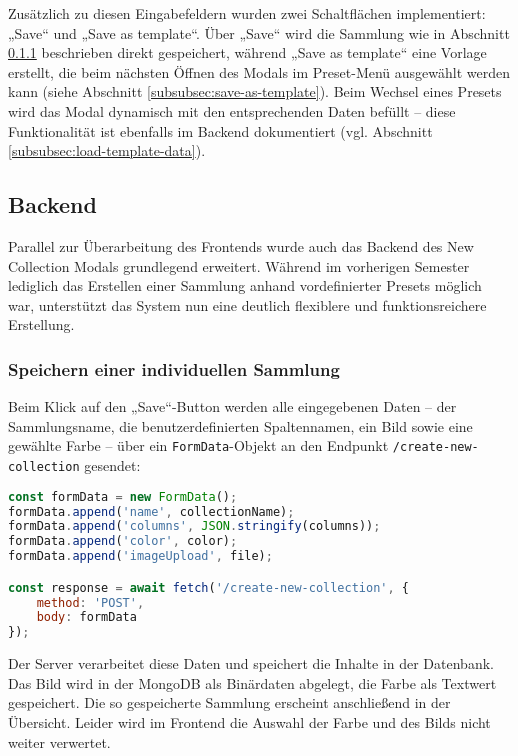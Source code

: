 Zusätzlich zu diesen Eingabefeldern wurden zwei Schaltflächen implementiert: „Save“ und „Save as template“.
Über „Save“ wird die Sammlung wie in Abschnitt \ref{subsubsec:save-new-collection} beschrieben direkt gespeichert, während „Save as template“ eine Vorlage erstellt, die beim nächsten Öffnen des Modals im Preset-Menü ausgewählt werden kann (siehe Abschnitt \ref{subsubsec:save-as-template}).
Beim Wechsel eines Presets wird das Modal dynamisch mit den entsprechenden Daten befüllt – diese Funktionalität ist ebenfalls im Backend dokumentiert (vgl. Abschnitt \ref{subsubsec:load-template-data}).

\subsection{Backend}\label{subsec:new-collection-backend}

Parallel zur Überarbeitung des Frontends wurde auch das Backend des New Collection Modals grundlegend erweitert.
Während im vorherigen Semester lediglich das Erstellen einer Sammlung anhand vordefinierter Presets möglich war, unterstützt das System nun eine deutlich flexiblere und funktionsreichere Erstellung.

\subsubsection{Speichern einer individuellen Sammlung}\label{subsubsec:save-new-collection}

Beim Klick auf den „Save“-Button werden alle eingegebenen Daten – der Sammlungsname, die benutzerdefinierten Spaltennamen, ein Bild sowie eine gewählte Farbe – über ein \texttt{FormData}-Objekt an den Endpunkt \texttt{/create-new-collection} gesendet:

\begin{lstlisting}[language=JavaScript, caption=Clientseitiges Speichern einer neuen Sammlung]
const formData = new FormData();
formData.append('name', collectionName);
formData.append('columns', JSON.stringify(columns));
formData.append('color', color);
formData.append('imageUpload', file);

const response = await fetch('/create-new-collection', {
    method: 'POST',
    body: formData
});
\end{lstlisting}

Der Server verarbeitet diese Daten und speichert die Inhalte in der Datenbank.
Das Bild wird in der MongoDB als Binärdaten abgelegt, die Farbe als Textwert gespeichert.
Die so gespeicherte Sammlung erscheint anschließend in der Übersicht.
Leider wird im Frontend die Auswahl der Farbe und des Bilds nicht weiter verwertet.

